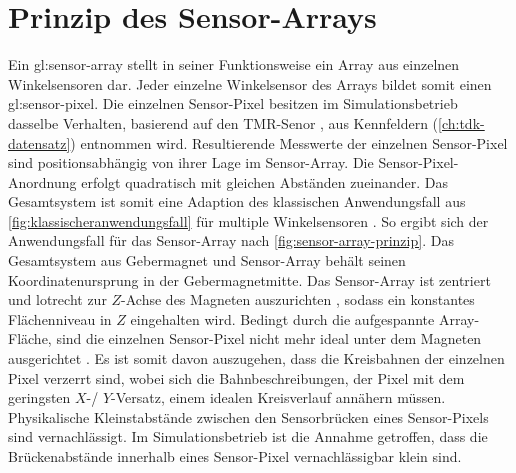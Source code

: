%

\section{Prinzip des Sensor-Arrays}\label{sec:prinzip-des-sensor-arrays}


Ein \gls{gl:sensor-array} stellt in seiner Funktionsweise ein Array aus einzelnen Winkelsensoren dar. Jeder einzelne Winkelsensor des Arrays bildet somit einen \gls{gl:sensor-pixel}. Die einzelnen Sensor-Pixel besitzen im Simulationsbetrieb dasselbe Verhalten, basierend auf den TMR-Senor \cite{TDK2016}, aus Kennfeldern (\autoref{ch:tdk-datensatz}) entnommen wird. Resultierende Messwerte der einzelnen Sensor-Pixel sind positionsabhängig von ihrer Lage im Sensor-Array\cite{Schuethe2019}. Die Sensor-Pixel-Anordnung erfolgt quadratisch mit gleichen Abständen zueinander. Das Gesamtsystem ist somit eine Adaption des klassischen Anwendungsfall aus \autoref{fig:klassischeranwendungsfall} für multiple Winkelsensoren \cite{Mehm2019}\cite{Schuethe2019}. So ergibt sich der Anwendungsfall für das Sensor-Array nach \autoref{fig:sensor-array-prinzip}.
\newline
Das Gesamtsystem aus Gebermagnet und Sensor-Array behält seinen Koordinatenursprung in der Gebermagnetmitte. Das Sensor-Array ist zentriert und lotrecht zur $Z$-Achse des Magneten auszurichten \cite{Schuethe2019}, sodass ein konstantes Flächenniveau in $Z$ eingehalten wird. Bedingt durch die aufgespannte Array-Fläche, sind die einzelnen Sensor-Pixel nicht mehr ideal unter dem Magneten ausgerichtet \cite{Schuethe2020b}. Es ist somit davon auszugehen, dass die Kreisbahnen der einzelnen Pixel verzerrt sind, wobei sich die Bahnbeschreibungen, der Pixel mit dem geringsten $X$-/ $Y$-Versatz, einem idealen Kreisverlauf annähern müssen. Physikalische Kleinstabstände zwischen den Sensorbrücken eines Sensor-Pixels sind vernachlässigt. Im Simulationsbetrieb ist die Annahme getroffen, dass die Brückenabstände innerhalb eines Sensor-Pixel vernachlässigbar klein sind.


\clearpage


